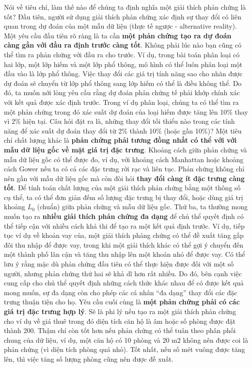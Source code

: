 Nói về tiêu chí, làm thế nào để chúng ta định nghĩa một giải thích phản chứng là tốt? Đầu tiên, người sử dụng giải thích phản chứng xác định sự thay đổi có liên quan trong dự đoán của một mẫu dữ liệu (thực tế ngược - alternative reality). Một yêu cầu đầu tiên rõ ràng là ta cần \textbf{một phản chứng tạo ra dự đoán càng gần với đầu ra định trước càng tốt}. Không phải lúc nào bạn cũng có thể tìm ra phản chứng với đầu ra cho trước. Ví dụ, trong bài toán phân loại có hai lớp, một lớp hiếm và một lớp phổ thông, mô hình có thể luôn phân loại một đầu vào là lớp phổ thông. Việc thay đổi các giá trị tính năng sao cho nhãn được dự đoán sẽ chuyển từ lớp phổ thông sang lớp hiếm có thể là điều không thể. Do đó, ta muốn nới lỏng yêu cầu rằng dự đoán phản chứng tế phải khớp chính xác với kết quả được xác định trước. Trong ví dụ phân loại, chúng ta có thể tìm ra một phản chứng trong đó xác suất dự đoán của loại hiếm được tăng lên 10\% thay vì 2\% hiện tại. Câu hỏi đặt ra là, những thay đổi tối thiểu nào trong các tính năng để xác suất dự đoán thay đổi từ 2\% thành 10\% (hoặc gần 10\%)? Một tiêu chí chất lượng khác là \textbf{phản chứng phải tương đồng nhất có thể với với mẫu dữ liệu gốc về mặt giá trị đặc trưng}. Khoảng cách giữa phản chứng và mẫu dữ liệu gốc có thể được đo, ví dụ, với khoảng cách Manhattan hoặc khoảng cách Gower nếu ta có cả các đặc trưng rời rạc và liên tục. Phản chứng không chỉ nên gần với mẫu dữ liệu gốc mà còn đòi hỏi \textbf{thay đổi càng ít đặc trưng càng tốt}. Để tính toán chất lượng của một giải thích phản chứng bằng một thông số cụ thể, ta có thể đơn giản đếm số lượng đặc trưng bị thay đổi, hoặc dùng giá trị khoảng $L_0$ (chuẩn) giữa phản chứng và mẫu dữ liệu gốc. Thứ ba, ta thường mong muốn tạo ra \textbf{nhiều giải thích phản chứng đa dạng} để chủ thể quyết định có thể tiếp cận với nhiều cách khả thi để tạo ra một kết quả định trước. Ví dụ, tiếp tục ví dụ về khoản vay của, một giải thích phảng chứng có thể đề xuất tăng gấp đôi thu nhập để được vay, trong khi một giải thích khác có thể gợi ý chuyển đến một thành phố lân cận và tăng thu nhập lên một khoản nhỏ để được vay. Có thể lưu ý rằng mặc dù phản chứng đầu tiên có thể thực hiện được đối với một số người, nhưng phản chứng thứ hai sẽ khả dĩ hơn rất nhiều. Do đó, bên cạnh việc cung cấp cho chủ thể quyết định những cách thức khác nhau để có được kết quả mong muốn, sự đa dạng còn cho phép các cá nhân ``đa dạng'' thay đổi các đặc trưng thuận tiện cho họ. Yêu cầu cuối cùng là \textbf{một phản chứng phải có các giá trị đặc trưng hợp lý}. Sẽ là phi lý nếu tạo ra một giải thích phản chứng cho ví dụ về giá thuê trong đó diện tích căn hộ là âm hoặc số phòng được đặt thành 200. Thậm chí còn tốt hơn nếu phản chứng có thể tuân theo phân phối chung của dữ liệu, ví dụ, một căn hộ có 10 phòng và 20 m2 không nên được coi là phản chứng (vì diện tích phòng quá nhỏ). Tốt nhất, nếu số mét vuông được tăng lên, thì việc tăng số lượng phòng cũng nên được đề xuất.

